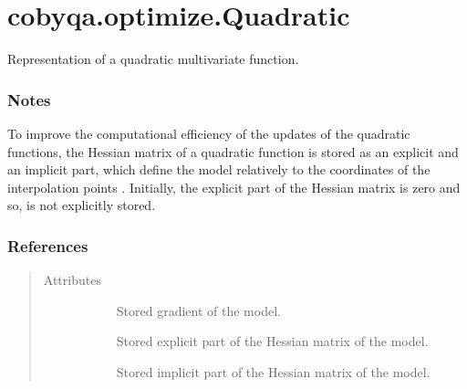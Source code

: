 \documentclass[letterpaper,10pt,english]{sphinxmanual}
\begin{document}
\section{cobyqa.optimize.Quadratic}
\label{\detokenize{refs/generated/cobyqa.optimize.Quadratic:cobyqa-optimize-quadratic}}\label{\detokenize{refs/generated/cobyqa.optimize.Quadratic::doc}}

\begin{fulllineitems}
\label{\detokenize{refs/generated/cobyqa.optimize.Quadratic:cobyqa.optimize.Quadratic}}
\sphinxAtStartPar
Representation of a quadratic multivariate function.
\subsubsection*{Notes}

\sphinxAtStartPar
To improve the computational efficiency of the updates of the quadratic
functions, the Hessian matrix of a quadratic function is stored as an
explicit and an implicit part, which define the model relatively to the
coordinates of the interpolation points . Initially, the explicit part
of the Hessian matrix is zero and so, is not explicitly stored.
\subsubsection*{References}

\sphinxAtStartPar
{}
\begin{quote}\begin{description}
\item[{Attributes}] \leavevmode\begin{description}
\item[{}] \leavevmode
\sphinxAtStartPar
Stored gradient of the model.

\item[{}] \leavevmode
\sphinxAtStartPar
Stored explicit part of the Hessian matrix of the model.

\item[{}] \leavevmode
\sphinxAtStartPar
Stored implicit part of the Hessian matrix of the model.


\end{description}
\end{description}
\end{quote}
\end{fulllineitems}
\end{document}
